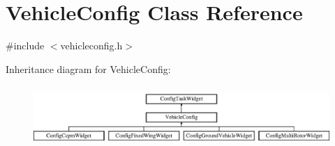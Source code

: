 \hypertarget{class_vehicle_config}{\section{\-Vehicle\-Config \-Class \-Reference}
\label{class_vehicle_config}
}


{\ttfamily \#include $<$vehicleconfig.\-h$>$}

\-Inheritance diagram for \-Vehicle\-Config\-:\begin{figure}[H]
\begin{center}
\leavevmode
\includegraphics[height=2.333333cm]{class_vehicle_config}
\end{center}
\end{figure}
